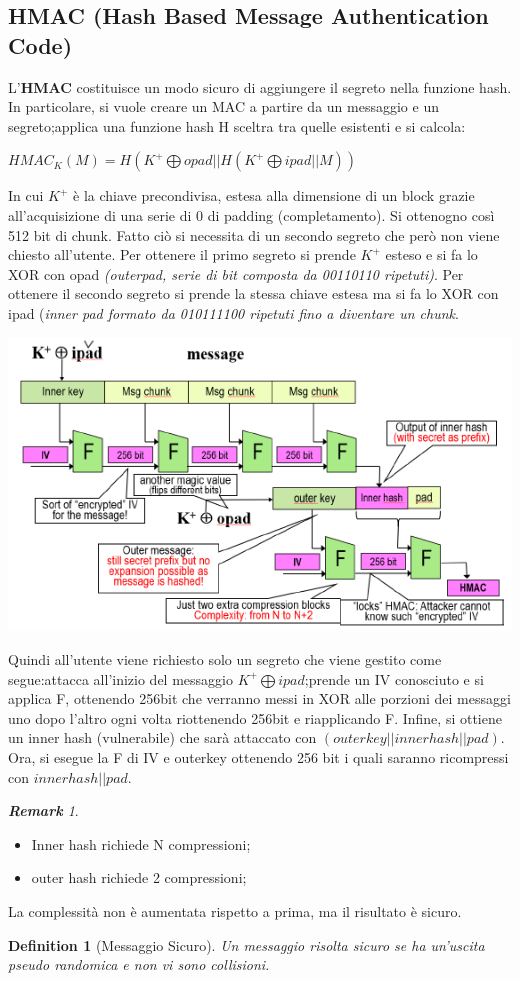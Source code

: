 \documentclass{book}
\newtheorem{definition}{Definition}[section]
\theoremstyle{remark}
\newtheorem*{remark}{\textbf{Remark}}
\begin{document}
\subsection{HMAC (Hash Based Message Authentication Code)}
L'\textbf{HMAC} costituisce un modo sicuro di aggiungere il segreto nella funzione hash\@. In particolare, si vuole creare un MAC a partire da un messaggio e un segreto;\@si applica una funzione hash H sceltra tra quelle esistenti e si calcola:
\begin{center}
	\(HMAC_K(M)=H(K^{+}\bigoplus opad||H(K^{+} \bigoplus ipad ||M))\)
\end{center}
In cui \(K^{+}\) è la chiave precondivisa, estesa alla dimensione di un block grazie all'acquisizione di una serie di 0 di padding (completamento)\@. Si ottenogno così 512 bit di chunk\@. Fatto ciò si necessita di un secondo segreto che però non viene chiesto all'utente\@.
Per ottenere il primo segreto si prende \(K^{+}\) esteso e si fa lo XOR con opad \emph{(outerpad, serie di bit composta da 00110110 ripetuti)}\@.
Per ottenere il secondo segreto si prende la stessa chiave estesa ma si fa lo XOR con ipad (\emph{inner pad formato da 010111100 ripetuti fino a diventare un chunk}\@.
\begin{center}
	\includegraphics[scale=0.9]{HMAC.png}
\end{center}
Quindi all'utente viene richiesto solo un segreto che viene gestito come segue:\@si attacca all'inizio del messaggio \(K^{+} \bigoplus ipad\);\@si prende un IV conosciuto e si applica F, ottenendo 256bit che verranno messi in XOR alle porzioni dei messaggi uno dopo l'altro ogni volta riottenendo 256bit e riapplicando F\@.
Infine, si ottiene un inner hash (vulnerabile) che sarà attaccato con \((outerkey||inner hash|| pad) \)\@. Ora, si esegue la F di IV e outerkey ottenendo 256 bit i quali saranno ricompressi con \(inner hash||pad\)\@.
\begin{remark}
	\begin{itemize}
		\item Inner hash richiede N compressioni;\@
		\item outer hash richiede 2 compressioni;\@
	\end{itemize}
	La complessità non è aumentata rispetto a prima, ma il risultato è sicuro\@.
\end{remark}
\begin{definition}[Messaggio Sicuro]
	Un messaggio risolta sicuro se ha un'uscita pseudo randomica e non vi sono collisioni\@.
\end{definition}
\end{document}
